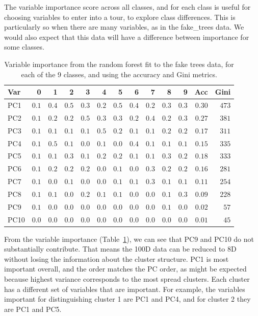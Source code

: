 \documentclass[
  letterpaper,
]{krantz}
\begin{document}

The variable importance score across all classes, and for each class is
useful for choosing variables to enter into a tour, to explore class
differences. This is particularly so when there are many variables, as
in the fake\_trees data. We would also expect that this data will have a
difference between importance for some classes.

\begin{longtable}{lrrrrrrrrrrrr}

\caption{\label{tbl-ft-importance}Variable importance from the random
forest fit to the fake trees data, for each of the 9 classes, and using
the accuracy and Gini metrics.}

\tabularnewline

\toprule
Var & 0 & 1 & 2 & 3 & 4 & 5 & 6 & 7 & 8 & 9 & Acc & Gini \\ 
\midrule
PC1 & $0.1$ & $0.4$ & $0.5$ & $0.3$ & $0.2$ & $0.5$ & $0.4$ & $0.2$ & $0.3$ & $0.3$ & $0.30$ & $473$ \\ 
PC2 & $0.1$ & $0.2$ & $0.2$ & $0.5$ & $0.3$ & $0.3$ & $0.2$ & $0.4$ & $0.2$ & $0.3$ & $0.27$ & $381$ \\ 
PC3 & $0.1$ & $0.1$ & $0.1$ & $0.1$ & $0.5$ & $0.2$ & $0.1$ & $0.1$ & $0.2$ & $0.2$ & $0.17$ & $311$ \\ 
PC4 & $0.1$ & $0.5$ & $0.1$ & $0.0$ & $0.1$ & $0.0$ & $0.4$ & $0.1$ & $0.1$ & $0.1$ & $0.15$ & $335$ \\ 
PC5 & $0.1$ & $0.1$ & $0.3$ & $0.1$ & $0.2$ & $0.2$ & $0.1$ & $0.1$ & $0.3$ & $0.2$ & $0.18$ & $333$ \\ 
PC6 & $0.1$ & $0.2$ & $0.2$ & $0.2$ & $0.0$ & $0.1$ & $0.0$ & $0.3$ & $0.2$ & $0.2$ & $0.16$ & $281$ \\ 
PC7 & $0.1$ & $0.0$ & $0.1$ & $0.0$ & $0.0$ & $0.1$ & $0.1$ & $0.3$ & $0.1$ & $0.1$ & $0.11$ & $254$ \\ 
PC8 & $0.1$ & $0.1$ & $0.0$ & $0.2$ & $0.1$ & $0.1$ & $0.0$ & $0.0$ & $0.1$ & $0.3$ & $0.09$ & $228$ \\ 
PC9 & $0.1$ & $0.0$ & $0.0$ & $0.0$ & $0.0$ & $0.0$ & $0.0$ & $0.0$ & $0.1$ & $0.0$ & $0.02$ & $57$ \\ 
PC10 & $0.0$ & $0.0$ & $0.0$ & $0.0$ & $0.0$ & $0.0$ & $0.0$ & $0.0$ & $0.0$ & $0.0$ & $0.01$ & $45$ \\ 
\bottomrule

\end{longtable}

From the variable importance (Table~\ref{tbl-ft-importance}), we can see
that PC9 and PC10 do not substantially contribute. That means the 100D
data can be reduced to 8D without losing the information about the
cluster structure. PC1 is most important overall, and the order matches
the PC order, as might be expected because highest variance corresponds
to the most spread clusters. Each cluster has a different set of
variables that are important. For example, the variables important for
distinguishing cluster 1 are PC1 and PC4, and for cluster 2 they are PC1
and PC5.
\end{document}
